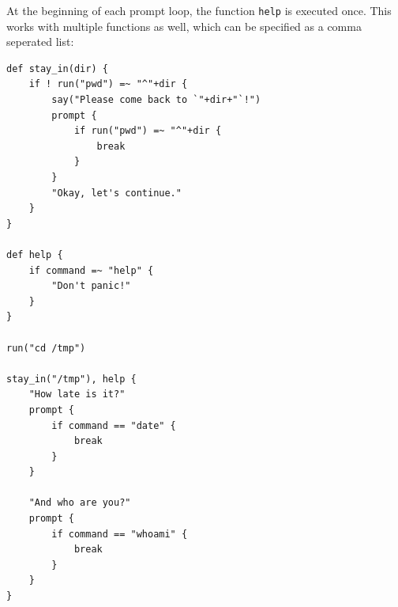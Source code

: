 \documentclass[paper=a4,abstract=on,cleardoublepage=empty,numbers=noenddot,toc=bib]{scrreprt}
\begin{document}
At the beginning of each prompt loop, the function \texttt{help} is executed once. This works with multiple functions as well, which can be specified as a comma seperated list:

\begin{lstlisting}
def stay_in(dir) {
    if ! run("pwd") =~ "^"+dir {
        say("Please come back to `"+dir+"`!")
        prompt {
            if run("pwd") =~ "^"+dir {
                break
            }
        }
        "Okay, let's continue."
    }
}

def help {
    if command =~ "help" {
        "Don't panic!"
    }
}

run("cd /tmp")

stay_in("/tmp"), help {
    "How late is it?"
    prompt {
        if command == "date" {
            break
        }
    }

    "And who are you?"
    prompt {
        if command == "whoami" {
            break
        }
    }
}
\end{lstlisting}
\end{document}
